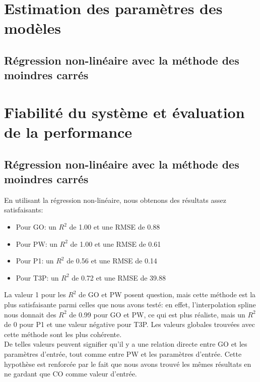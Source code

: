 \documentclass[12pt]{article}
\begin{document}
\section{Estimation des paramètres des modèles}
\subsection{Régression non-linéaire avec la méthode des moindres carrés}


\section{Fiabilité du système et évaluation de la performance}
\subsection{Régression non-linéaire avec la méthode des moindres carrés}
En utilisant la régression non-linéaire, nous obtenons des résultats assez satisfaisants:
\begin{itemize}
	\item Pour GO: un \(R^{2}\) de 1.00 et une RMSE de 0.88
	\item Pour PW: un \(R^{2}\) de 1.00 et une RMSE de 0.61
	\item Pour P1: un \(R^{2}\) de 0.56 et une RMSE de 0.14
	\item Pour T3P: un \(R^{2}\) de 0.72 et une RMSE de 39.88
\end{itemize}
La valeur 1 pour les \(R^{2}\) de GO et PW posent question, mais cette méthode est la plus satisfaisante parmi celles que nous avons testé: en effet, l'interpolation spline nous donnait des \(R^{2}\) de 0.99 pour GO et PW, ce qui est plus réaliste, mais un \(R^{2}\) de 0 pour P1 et une valeur négative pour T3P. Les valeurs globales trouvées avec cette méthode sont les plus cohérente. \\

De telles valeurs peuvent signifier qu'il y a une relation directe entre GO et les paramètres d'entrée, tout comme entre PW et les paramètres d'entrée. Cette hypothèse est renforcée par le fait que nous avons trouvé les mêmes résultats en ne gardant que CO comme valeur d'entrée.
\end{document}

